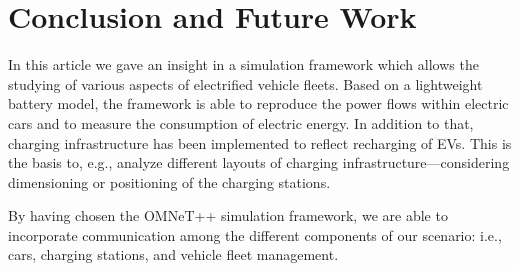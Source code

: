 \documentclass[conference]{IEEEtran}
\begin{document}
\section{Conclusion and Future Work}

In this article we gave an insight in a simulation framework which allows the studying of various aspects of electrified vehicle fleets.
Based on a lightweight battery model, the framework is able to reproduce the power flows within electric cars and to measure the consumption of electric energy.
In addition to that, charging infrastructure has been implemented to reflect recharging of EVs.
This is the basis to, e.g., analyze different layouts of charging infrastructure---considering dimensioning or positioning
of the charging stations.

By having chosen the OMNeT++ simulation framework, we are able to incorporate communication among the different components of our scenario: i.e., cars, charging stations, and vehicle fleet management.








\end{document}
